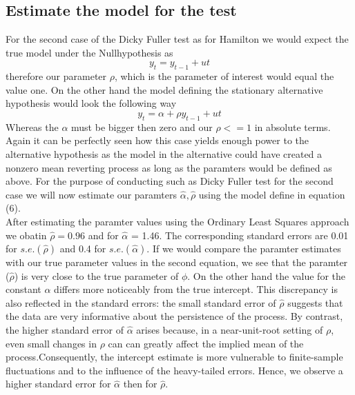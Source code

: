 \documentclass[a4paper,12pt]{article}
\begin{document}
\subsection{Estimate the model for the test}
For the second case of the Dicky Fuller test as for Hamilton we would expect the true model under the Nullhypothesis as 
\begin{equation}
    y_t = y_{t-1} + ut
\end{equation}
therefore our parameter $\rho$, which is the parameter of interest would equal the value one. On the other hand the model defining the stationary alternative hypothesis would look the following way
\begin{equation}
    y_t = \alpha + \rho y_{t-1} + ut
\end{equation}
Whereas the $\alpha$ must be bigger then zero and our $\rho <= 1$ in absolute terms. 
Again it can be perfectly seen how this case yields enough power to the alternative hypothesis as the model in the alternative could have created a nonzero mean reverting process as long as the paramters would be defined as above.
For the purpose of conducting such as Dicky Fuller test for the second case we will now estimate our paramters $\hat{\alpha}, \hat{\rho}$ using the model define in equation (6).
\\
After estimating the paramter values using the Ordinary Least Squares approach we obatin $\hat{\rho} = 0.96$ and for $\hat{\alpha}$ = 1.46. The corresponding standard errors are 0.01 for $s.e.(\hat{\rho})$ and 0.4 for $s.e.(\hat{\alpha})$. If we would compare the  paramter estimates with our true parameter values in the second equation, we see that the paramter ($\hat{\rho}$) is very close to the true parameter of $\phi$. On the other hand the value for the constant $\alpha$ differs more noticeably from the true intercept.
This discrepancy is also reflected in the standard errors: the small standard error of $\hat{\rho}$ suggests that the data are very informative about the persistence of the process. By contrast, the higher standard error of $\hat{\alpha}$ arises because, in a near-unit-root setting of $\rho$, even small changes in $\rho$ can can greatly affect the implied mean of the process.Consequently, the intercept estimate is more vulnerable to finite-sample fluctuations and to the influence of the heavy-tailed errors.
Hence, we observe a higher standard error for $\hat{\alpha}$ then for $\hat{\rho}$.
\end{document}
